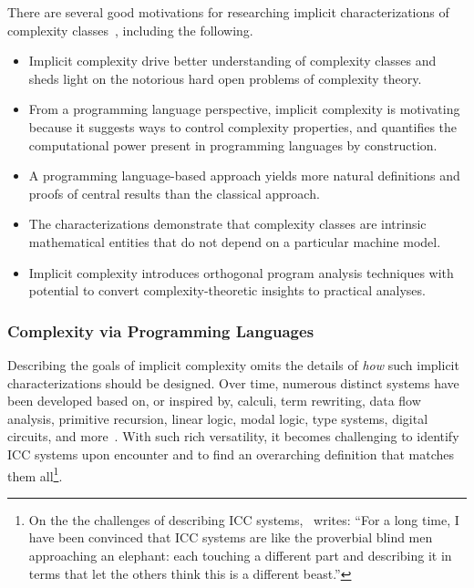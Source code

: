 There are several good motivations for researching implicit characterizations of
complexity classes~\cite[p.
36]{kristiansen2017,jones1999}, including the following.
\begin{itemize}

\item Implicit complexity drive better understanding of complexity
classes and sheds light on the notorious hard open
problems of complexity theory.

\item From a programming language perspective, implicit complexity is motivating
because it suggests ways to control complexity properties, and quantifies the
computational power present in programming languages by construction.

\item A programming language-based approach yields more {natural definitions and
proofs} of central results than the classical approach.

\item The characterizations demonstrate that complexity classes are intrinsic
mathematical entities that do not depend on a particular machine
model.

\item Implicit complexity introduces orthogonal program analysis techniques with
potential to convert complexity-theoretic insights to practical analyses.

\end{itemize}

\subsubsection{Complexity via Programming Languages}

Describing the goals of implicit complexity omits the details of \emph{how} such
implicit characterizations should be designed. Over time, numerous distinct
systems have been developed based on, or inspired by, \eg calculi, term
rewriting, data flow analysis,
primitive recursion, linear logic, modal logic, type systems, digital
circuits, and
more~\cite{kristiansen2017,marion2011,moyen2017,baillot2012}. With such rich
versatility, it becomes challenging to identify ICC systems upon encounter and
to find an overarching definition that matches them all\footnote{ On the the
challenges of describing ICC systems,~\textcite[p. 14]{moyen2017} writes:
\enquote{For a long time, I have been convinced that ICC systems are like the
proverbial blind men approaching an elephant: each touching a different part and
describing it in terms that let the others think this is a different beast.}}.

